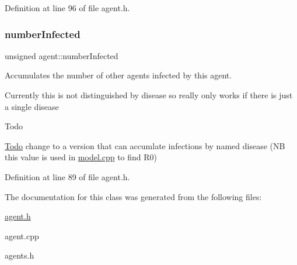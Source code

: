 Definition at line 96 of file agent.\+h.

\mbox{\label{classagent_a4145c90d534f84deb22a93560809134c}} 
\subsubsection{\texorpdfstring{number\+Infected}{numberInfected}}
{\footnotesize\ttfamily unsigned agent\+::number\+Infected}



Accumulates the number of other agents infected by this agent. 

Currently this is not distinguished by disease so really only works if there is just a single disease \begin{DoxyRefDesc}{Todo}
\item[\mbox{\hyperlink{todo__todo000001}{Todo}}]change to a version that can accumlate infections by named disease (NB this value is used in \mbox{\hyperlink{model_8cpp}{model.\+cpp}} to find R0) \end{DoxyRefDesc}


Definition at line 89 of file agent.\+h.



The documentation for this class was generated from the following files\+:\begin{DoxyCompactItemize}
\item 
\mbox{\hyperlink{agent_8h}{agent.\+h}}\item 
agent.\+cpp\item 
agents.\+h\end{DoxyCompactItemize}
